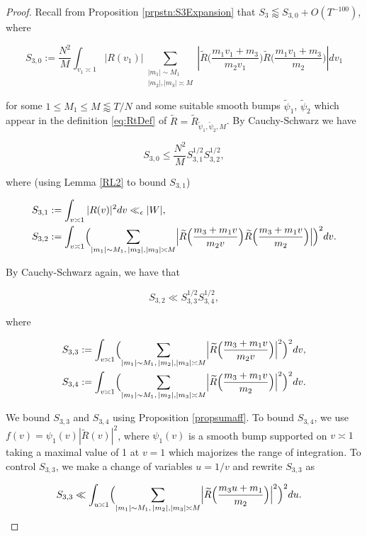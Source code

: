 \documentclass{amsart}
\theoremstyle{plain}
\numberwithin{equation}{section}
\renewcommand{\tilde}{\widetilde}
\begin{document}
\begin{proof}

Recall from Proposition \ref{prpstn:S3Expansion} that $S_3\lessapprox S_{3,0}+O(T^{-100})$, where

\[  
S_{3,0}:=\frac{N^2}{M} \int_{v_1 \asymp 1}  | R ( v_1 ) |   \sum_{\substack{|m_1| \sim M_1\\  |m_2|,  |m_3| \asymp M}} \left| \tilde{R} \Big( \frac{ m_1 v_1 + m_3}{m_2 v_1} \Big) \tilde{R} \Big( \frac{m_1 v_1 + m_3}{m_2} \Big)\right|  dv_1   
\]

for some $1\le M_1\le M\lessapprox T/N$ and some suitable smooth bumps $\tilde{\psi}_1$, $\tilde{\psi}_2$ which appear in the definition \eqref{eq:RtDef} of $\tilde{R}=\tilde{R}_{\tilde{\psi}_1,\tilde{\psi}_2,M}$. By Cauchy-Schwarz we have

\[
S_{3,0}\le \frac{N^2}{M} S_{3,1}^{1/2}S_{3,2}^{1/2},
\]

where (using Lemma \ref{RL2} to bound $S_{3,1}$)

\begin{align*}
S_{3,1}&:=\int_{v \asymp 1}  | R(v)|^2dv\ll_\epsilon |W|,\\
S_{3,2}&:=\int_{v \asymp 1}  \Bigl( \sum_{|m_1| \sim M_1,\,   |m_2|,  |m_3| \asymp M}  \Bigr| \tilde{R}\Bigl(\frac{m_3+m_1v}{m_2v}\Bigr) \tilde{R}\Bigl(\frac{m_3+m_1v}{m_2}\Bigr)\Bigr|\Bigr)^2dv.
\end{align*}

By Cauchy-Schwarz again, we have that

\[
S_{3,2}\ll S_{3,3}^{1/2}S_{3,4}^{1/2},
\]

where 

\begin{align*}
S_{3,3}&:=\int_{v \asymp 1}  \Bigl(  \sum_{|m_1| \sim M_1, \,  |m_2|,  |m_3| \asymp M} \Bigr|\tilde{R}\Bigl(\frac{m_3+m_1v}{m_2v}\Bigr)\Bigr|^2\Bigr)^2dv,\\
S_{3,4}&:=\int_{v \asymp 1}  \Bigl(  \sum_{|m_1| \sim M_1, \,  |m_2|,  |m_3| \asymp M} \Bigr|\tilde{R}\Bigl(\frac{m_3+m_1v}{m_2}\Bigr)\Bigr|^2\Bigr)^2dv.
\end{align*}

We bound $S_{3,3}$ and $S_{3,4}$ using Proposition \ref{propsumaff}.  To bound $S_{3,4}$, we use $f(v) =  \psi_1(v) |\tilde{R}(v)|^2$, where $\psi_1(v)$ is a smooth bump supported on $v \asymp 1$ taking a maximal value of 1 at $v=1$ which majorizes the range of integration.   To control $S_{3,3}$, we make a change of variables $u=1/v$ and rewrite $S_{3,3}$ as 

\begin{align*}
S_{3,3}&\ll \int_{u \asymp 1} \Bigl( \sum_{|m_1| \sim M_1, \,  |m_2|,  |m_3| \asymp M} \Bigr|\tilde{R}\Bigl(\frac{m_3u+m_1}{m_2}\Bigr)\Bigr|^2\Bigr)^2du.
\end{align*}


\end{proof}
\end{document}
